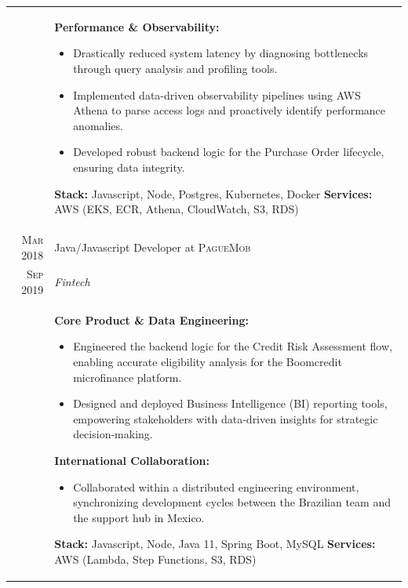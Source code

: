 \documentclass[a4paper,10pt]{article}
\begin{document}
\begin{supertabular}{r|p{15cm}}
& \footnotesize{
 \textbf{Performance \& Observability:}
 \begin{itemize}
    \item Drastically reduced system latency by diagnosing bottlenecks through query analysis and profiling tools.
    \item Implemented data-driven observability pipelines using AWS Athena to parse access logs and proactively identify performance anomalies.
    \item Developed robust backend logic for the Purchase Order lifecycle, ensuring data integrity.
 \end{itemize}
 \textbf{Stack:} Javascript, Node, Postgres, Kubernetes, Docker \textbf{\textbar{} Services:} AWS (EKS, ECR, Athena, CloudWatch, S3, RDS)}\\[0.5em]


\textsc{Mar 2018} & Java/Javascript Developer at \textsc{PagueMob} \\
\textsc{Sep 2019}&\emph{Fintech}\\
& \footnotesize{
 \textbf{Core Product \& Data Engineering:}
 \begin{itemize}
    \item Engineered the backend logic for the Credit Risk Assessment flow, enabling accurate eligibility analysis for the Boomcredit microfinance platform.
    \item Designed and deployed Business Intelligence (BI) reporting tools, empowering stakeholders with data-driven insights for strategic decision-making.
 \end{itemize}
 \textbf{International Collaboration:}
 \begin{itemize}
    \item Collaborated within a distributed engineering environment, synchronizing development cycles between the Brazilian team and the support hub in Mexico.
 \end{itemize}
 \textbf{Stack:} Javascript, Node, Java 11, Spring Boot, MySQL \textbf{\textbar{} Services:} AWS (Lambda, Step Functions, S3, RDS)}\\[0.5em]


\end{supertabular}
\end{document}
